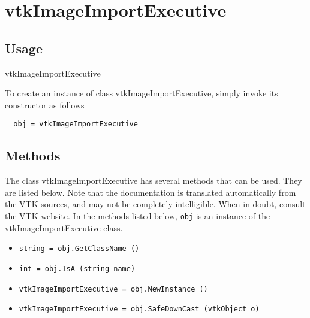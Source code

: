 \section{vtkImageImportExecutive}

\subsection{Usage}

 vtkImageImportExecutive

To create an instance of class vtkImageImportExecutive, simply
invoke its constructor as follows
\begin{verbatim}
  obj = vtkImageImportExecutive
\end{verbatim}
\subsection{Methods}

The class vtkImageImportExecutive has several methods that can be used.
  They are listed below.
Note that the documentation is translated automatically from the VTK sources,
and may not be completely intelligible.  When in doubt, consult the VTK website.
In the methods listed below, \verb|obj| is an instance of the vtkImageImportExecutive class.
\begin{itemize}
\item  \verb|string = obj.GetClassName ()|

\item  \verb|int = obj.IsA (string name)|

\item  \verb|vtkImageImportExecutive = obj.NewInstance ()|

\item  \verb|vtkImageImportExecutive = obj.SafeDownCast (vtkObject o)|

\end{itemize}
